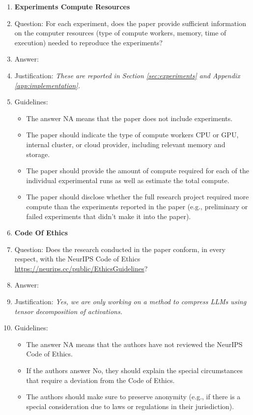 \documentclass{article}
\theoremstyle{plain}
\begin{document}
\begin{enumerate}
\item {\bf Experiments Compute Resources}
    \item[] Question: For each experiment, does the paper provide sufficient information on the computer resources (type of compute workers, memory, time of execution) needed to reproduce the experiments?
    \item[] Answer: \answerYes %
    \item[] Justification: \textit{These are reported in Section \ref{sec:experiments} and Appendix \ref{app:implementation}.}
    \item[] Guidelines:
    \begin{itemize}
        \item The answer NA means that the paper does not include experiments.
        \item The paper should indicate the type of compute workers CPU or GPU, internal cluster, or cloud provider, including relevant memory and storage.
        \item The paper should provide the amount of compute required for each of the individual experimental runs as well as estimate the total compute. 
        \item The paper should disclose whether the full research project required more compute than the experiments reported in the paper (e.g., preliminary or failed experiments that didn't make it into the paper). 
    \end{itemize}
    
\item {\bf Code Of Ethics}
    \item[] Question: Does the research conducted in the paper conform, in every respect, with the NeurIPS Code of Ethics \url{https://neurips.cc/public/EthicsGuidelines}?
    \item[] Answer: \answerYes %
    \item[] Justification: \textit{Yes, we are only working on a method to compress LLMs using tensor decomposition of activations.}
    \item[] Guidelines:
    \begin{itemize}
        \item The answer NA means that the authors have not reviewed the NeurIPS Code of Ethics.
        \item If the authors answer No, they should explain the special circumstances that require a deviation from the Code of Ethics.
        \item The authors should make sure to preserve anonymity (e.g., if there is a special consideration due to laws or regulations in their jurisdiction).
    \end{itemize}



\end{enumerate}
\end{document}
